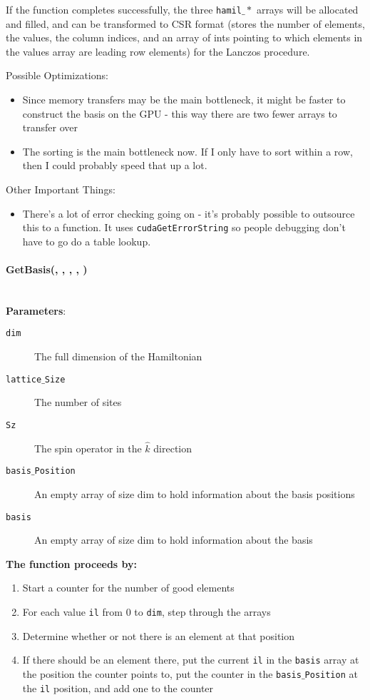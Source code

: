 \documentclass{article}
\begin{document}
If the function completes successfully, the three \texttt{hamil$\_*$} arrays will be allocated and filled, and can be transformed to CSR format (stores the number of elements, the values, the column indices, and an array of ints pointing to which elements in the values array are leading row elements) for the Lanczos procedure.
 
Possible Optimizations:
\begin{itemize}
\item{Since memory transfers may be the main bottleneck, it might be faster to construct the basis on the GPU - this way there are two fewer arrays to transfer over}
\item{The sorting is the main bottleneck now. If I only have to sort within a row, then I could probably speed that up a lot.}
\end{itemize}

Other Important Things:
\begin{itemize}
\item{ There's a lot of error checking going on - it's probably possible to outsource this to a function. It uses \texttt{cudaGetErrorString} so people debugging don't have to go do a table lookup.}
\end{itemize} 

\paragraph{\host \void GetBasis(\int , \int , \int , \ptrint , \ptrint ) \\ \\}
\noindent\textbf{Parameters}:
\begin{description}
\item[\int \texttt{dim}] The full dimension of the Hamiltonian
\item[\int \texttt{lattice$\_$Size}] The number of sites
\item[\int \texttt{Sz}] The spin operator in the $\hat{k}$ direction
\item[\ptrint \texttt{basis$\_$Position}] An empty array of size dim to hold information about the basis positions
\item[\ptrint \texttt{basis}] An empty array of size dim to hold information about the basis
\end{description}

\noindent\textbf{The function proceeds by:}
\begin{enumerate}
\item{Start a counter for the number of good elements}
\item{For each value \texttt{il} from 0 to \texttt{dim}, step through the arrays}
\item{Determine whether or not there is an element at that position}
\item{If there should be an element there, put the current \texttt{il} in the \texttt{basis} array at the position the counter points to, put the counter in the \texttt{basis$\_$Position} at the \texttt{il} position, and add one to the counter}
\end{enumerate}
\end{document}
